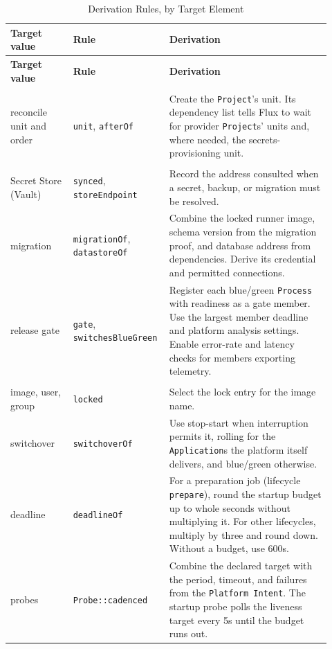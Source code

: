 \begin{longtable}{>{\raggedright\arraybackslash}p{0.19\linewidth}>{\raggedright\arraybackslash}p{0.24\linewidth}>{\raggedright\arraybackslash}p{0.49\linewidth}}
\hline
\textbf{Target value} & \textbf{Rule} & \textbf{Derivation} \\
\hline
\endfirsthead
\hline
\textbf{Target value} & \textbf{Rule} & \textbf{Derivation} \\
\hline
\endhead
\hline
\endfoot
\hline
\caption{Derivation Rules, by Target Element}
\label{tab:rules}
\endlastfoot
\multicolumn{3}{l}{\emph{Project}} \\
reconcile unit and order & \texttt{unit}, \texttt{afterOf} & Create the \texttt{Project}'s unit. Its dependency list tells Flux to wait for provider \texttt{Project}s' units and, where needed, the secrets-provisioning unit. \\
\multicolumn{3}{l}{\emph{Application}} \\
Secret Store (Vault) & \texttt{synced}, \texttt{storeEndpoint} & Record the address consulted when a secret, backup, or migration must be resolved. \\
migration & \texttt{migrationOf}, \texttt{datastoreOf} & Combine the locked runner image, schema version from the migration proof, and database address from dependencies. Derive its credential and permitted connections. \\
release gate & \texttt{gate}, \texttt{switchesBlueGreen} & Register each blue/green \texttt{Process} with readiness as a gate member. Use the largest member deadline and platform analysis settings. Enable error-rate and latency checks for members exporting telemetry. \\
\multicolumn{3}{l}{\emph{Process}} \\
image, user, group & \texttt{locked} & Select the lock entry for the image name. \\
switchover & \texttt{switchoverOf} & Use stop-start when interruption permits it, rolling for the \texttt{Application}s the platform itself delivers, and blue/green otherwise. \\
deadline & \texttt{deadlineOf} & For a preparation job (lifecycle \texttt{prepare}), round the startup budget up to whole seconds without multiplying it. For other lifecycles, multiply by three and round down. Without a budget, use 600s. \\
probes & \texttt{Probe::cadenced} & Combine the declared target with the period, timeout, and failures from the \texttt{Platform Intent}. The startup probe polls the liveness target every 5s until the budget runs out. \\

\end{longtable}
